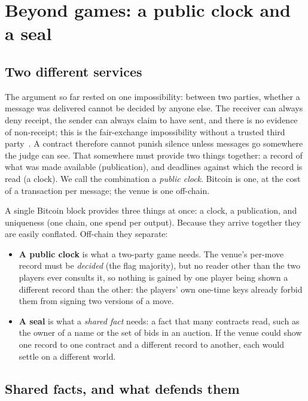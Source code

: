\documentclass[11pt]{article}
\begin{document}
\section{Beyond games: a public clock and a seal}
\label{sec:beyond}

\subsection{Two different services}

The argument so far rested on one impossibility: between two parties,
whether a message was delivered cannot be decided by anyone else. The
receiver can always deny receipt, the sender can always claim to have
sent, and there is no evidence of non-receipt; this is the fair-exchange
impossibility without a trusted third party~\cite{pagnia}. A contract
therefore cannot punish silence unless messages go somewhere the judge
can see. That somewhere must provide two things together: a record of
what was made available (publication), and deadlines against which
the record is read (a clock). We call the combination a \emph{public
clock}. Bitcoin is one, at the cost of a transaction per message; the
venue is one off-chain.

A single Bitcoin block provides three things at once: a clock, a
publication, and uniqueness (one chain, one spend per output). Because
they arrive together they are easily conflated. Off-chain they separate:
\begin{itemize}
\item \textbf{A public clock} is what a two-party game needs. The
  venue's per-move record must be \emph{decided} (the flag majority), but
  no reader other than the two players ever consults it, so nothing is
  gained by one player being shown a different record than the other: the
  players' own one-time keys already forbid them from signing two
  versions of a move.
\item \textbf{A seal} is what a \emph{shared fact} needs: a fact that
  many contracts read, such as the owner of a name or the set of bids in
  an auction. If the venue could show one record to one contract and a
  different record to another, each would settle on a different world.
\end{itemize}

\subsection{Shared facts, and what defends them}
\label{sec:shared}
\end{document}
